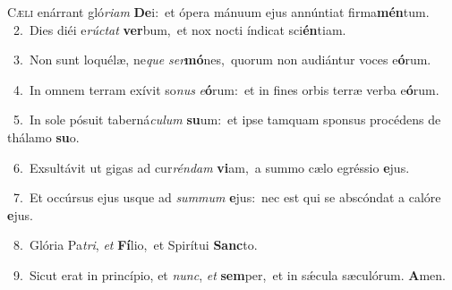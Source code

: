 \lettrine{\initial\textcolor{\initialcolor}{C}}{æli} enárrant gló\-\textit{ri}\-\textit{am} \textbf{De}\-i:~\star et ópera mánuum ejus annúntiat firma\-\textbf{mén}\-tum.\\
{\numbfont\textcolor{\numbcolor}{~2.}}~Dies diéi e\-\textit{rúc}\-\textit{tat} \textbf{ver}\-bum,~\star et nox nocti índicat sci\-\textbf{én}\-tiam.\par
{\numbfont\textcolor{\numbcolor}{~3.}}~Non sunt loquélæ, ne\textit{que} \textit{ser}\-\textbf{mó}nes,~\star quorum non audiántur voces e\-\textbf{ó}\-rum.\par
{\numbfont\textcolor{\numbcolor}{~4.}}~In omnem terram exívit so\textit{nus} \textit{e}\-\textbf{ó}rum:~\star et in fines orbis terræ verba e\-\textbf{ó}\-rum.\par
{\numbfont\textcolor{\numbcolor}{~5.}}~In sole pósuit taberná\-\textit{cu}\-\textit{lum} \textbf{su}\-um:~\star et ipse tamquam sponsus procédens de thálamo \textbf{su}\-o.\par
{\numbfont\textcolor{\numbcolor}{~6.}}~Exsultávit ut gigas ad cur\-\textit{rén}\-\textit{dam} \textbf{vi}\-am,~\star a summo cælo egréssio \textbf{e}\-jus.\par
{\numbfont\textcolor{\numbcolor}{~7.}}~Et occúrsus ejus usque ad \textit{sum}\-\textit{mum} \textbf{e}\-jus:~\star nec est qui se abscóndat a calóre \textbf{e}\-jus.\par
{\numbfont\textcolor{\numbcolor}{~8.}}~Glória Pa\-\textit{tri}\-, \textit{et} \textbf{Fí}\-lio,~\star et Spirítui \textbf{Sanc}\-to.\par
{\numbfont\textcolor{\numbcolor}{~9.}}~Sicut erat in princípio, et \textit{nunc}\-, \textit{et} \textbf{sem}\-per,~\star et in sǽcula sæculórum. \textbf{A}\-men.\par
